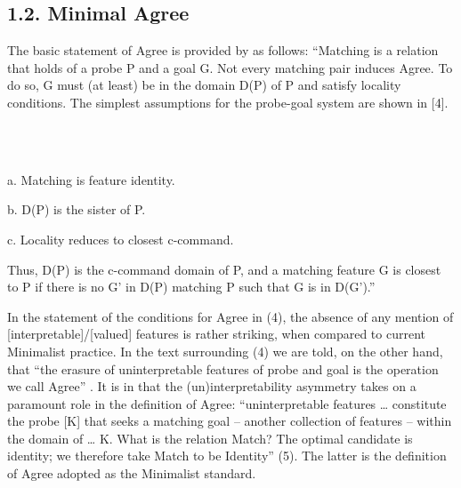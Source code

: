 \documentclass[output=paper]{langsci/langscibook}
\begin{document}
\subsection{ 1.2. Minimal Agree} 

\begin{styleSfondomedioiColorexxi}
The basic statement of Agree is provided by \citet[122]{Chomsky2000} as follows: “Matching is a relation that holds of a probe P and a goal G. Not every matching pair induces Agree. To do so, G must (at least) be in the domain D(P) of P and satisfy locality conditions. The simplest assumptions for the probe-goal system are shown in [4].
\end{styleSfondomedioiColorexxi}

\begin{styleSfondomedioiColorexxi}
\ea%
    \label{ex:key:4}
    \gll\\
        \\
    \glt
    \z

           a.   Matching is feature identity.
\end{styleSfondomedioiColorexxi}

\begin{styleSfondomedioiColorexxi}
b.   D(P) is the sister of P.
\end{styleSfondomedioiColorexxi}

\begin{styleSfondomedioiColorexxi}
c.   Locality reduces to closest c-command. 
\end{styleSfondomedioiColorexxi}

\begin{styleSfondomedioiColorexxi}
Thus, D(P) is the c-command domain of P, and a matching feature G is closest to P if there is no G' in D(P) matching P such that G is in D(G').” 
\end{styleSfondomedioiColorexxi}

\begin{styleSfondomedioiColorexxi}
In the statement of the conditions for Agree in (4), the absence of any mention of [interpretable]/[valued] features is rather striking, when compared to current Minimalist practice. In the text surrounding (4) we are told, on the other hand, that “the erasure of uninterpretable features of probe and goal is the operation we call Agree” \citep[122]{Chomsky2000}. It is in \citet{Chomsky2001} that the (un)interpretability asymmetry takes on a paramount role in the definition of Agree: “uninterpretable features … constitute the probe [K] that seeks a matching goal – another collection of features – within the domain of … K. What is the relation Match? The optimal candidate is identity; we therefore take Match to be Identity” (5). The latter is the definition of Agree adopted as the Minimalist standard.
\end{styleSfondomedioiColorexxi}
\end{document}
